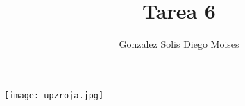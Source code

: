 \documentclass[12pt,a4paper]{article}
\author{Gonzalez Solis Diego Moises}
\title{Tarea 6}
\begin{document}
\maketitle
\texttt{[image: upzroja.jpg]} 
\newpage

\end{document}
